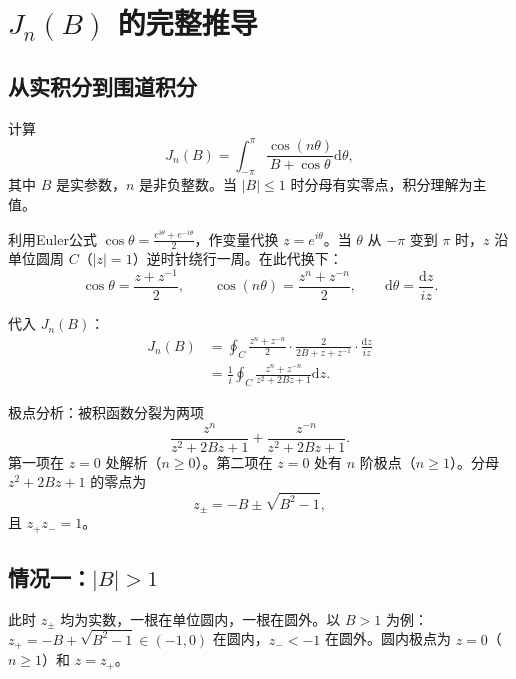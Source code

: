 \documentclass{article} %
\newcommand{\di}{\mathrm{d}}
\begin{document}
\section{$J_n(B)$ 的完整推导}

\subsection{从实积分到围道积分}

计算
\begin{equation}
    J_n(B) = \int_{-\pi}^{\pi}\frac{\cos(n\theta)}{B + \cos\theta} \di\theta,
    \label{eq:A1}
\end{equation}
其中 $B$ 是实参数，$n$ 是非负整数。当 $|B|\le 1$ 时分母有实零点，积分理解为主值。

利用Euler公式 $\cos\theta = \frac{e^{i\theta} + e^{-i\theta}}{2}$，作变量代换 $z = e^{i\theta}$。当 $\theta$ 从 $-\pi$ 变到 $\pi$ 时，$z$ 沿单位圆周 $C$（$|z|=1$）逆时针绕行一周。在此代换下：
\begin{equation}
    \cos\theta = \frac{z+z^{-1}}{2},\qquad \cos(n\theta) = \frac{z^n+z^{-n}}{2},\qquad \di\theta = \frac{\di z}{iz}.
\end{equation}

代入 $J_n(B)$：
\begin{align}
    J_n(B) &= \oint_C \frac{z^n+z^{-n}}{2}\cdot \frac{2}{2B+z+z^{-1}}\cdot \frac{\di z}{iz} \nonumber\\
    &= \frac{1}{i}\oint_C \frac{z^n+z^{-n}}{z^2+2Bz+1} \di z.
    \label{eq:A2}
\end{align}

极点分析：被积函数分裂为两项
\begin{equation}
    \frac{z^n}{z^2+2Bz+1} + \frac{z^{-n}}{z^2+2Bz+1}.
\end{equation}
第一项在 $z=0$ 处解析（$n\ge 0$）。第二项在 $z=0$ 处有 $n$ 阶极点（$n\ge 1$）。分母 $z^2+2Bz+1$ 的零点为
\begin{equation}
    z_{\pm} = -B \pm \sqrt{B^2-1},
    \label{eq:A3}
\end{equation}
且 $z_+ z_- = 1$。

\subsection{情况一：$|B| > 1$}

此时 $z_{\pm}$ 均为实数，一根在单位圆内，一根在圆外。以 $B>1$ 为例：$z_+ = -B+\sqrt{B^2-1} \in (-1,0)$ 在圆内，$z_- < -1$ 在圆外。圆内极点为 $z=0$（$n\ge 1$）和 $z=z_+$。
\end{document}
